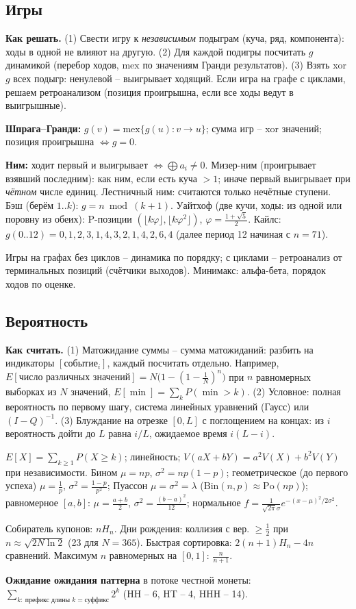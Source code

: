 \subsection{Игры}
\textbf{Как решать.} (1) Свести игру к \emph{независимым} подыграм (куча, ряд, компонента): ходы в одной не влияют на другую. (2) Для каждой подигры посчитать $g$ динамикой (перебор ходов, $\mathrm{mex}$ по значениям Гранди результатов). (3) Взять xor $g$ всех подыгр: ненулевой -- выигрывает ходящий. Если игра на графе с циклами, решаем ретроанализом (позиция проигрышна, если все ходы ведут в выигрышные).
\par \textbf{Шпрага--Гранди:} $g(v)=\mathrm{mex}\{g(u):v\to u\}$; сумма игр -- xor значений; позиция проигрышна $\iff g=0$.
\par \textbf{Ним:} ходит первый и выигрывает $\iff\bigoplus a_i\ne0$. Мизер-ним (проигрывает взявший последним): как ним, если есть куча $>1$; иначе первый выигрывает при \emph{чётном} числе единиц. Лестничный ним: считаются только нечётные ступени. Бэш (берём $1..k$): $g=n\bmod(k{+}1)$. Уайтхоф (две кучи, ходы: из одной или поровну из обеих): P-позиции $(\lfloor k\varphi\rfloor,\lfloor k\varphi^2\rfloor)$, $\varphi=\frac{1+\sqrt5}2$. Кайлс: $g(0..12)=0,1,2,3,1,4,3,2,1,4,2,6,4$ (далее период 12 начиная с $n=71$).
\par Игры на графах без циклов -- динамика по порядку; с циклами -- ретроанализ от терминальных позиций (счётчики выходов). Минимакс: альфа-бета, порядок ходов по оценке.
\subsection{Вероятность}
\textbf{Как считать.} (1) Матожидание суммы -- сумма матожиданий: разбить на индикаторы $[\text{событие}_i]$, каждый посчитать отдельно. Например, $E[\text{число различных значений}]=N\big(1-(1-\tfrac1N)^n\big)$ при $n$ равномерных выборках из $N$ значений, $E[\min]=\sum_kP(\min>k)$. (2) Условное: полная вероятность по первому шагу, система линейных уравнений (Гаусс) или $(I-Q)^{-1}$. (3) Блуждание на отрезке $[0,L]$ с поглощением на концах: из $i$ вероятность дойти до $L$ равна $i/L$, ожидаемое время $i(L-i)$.
\par $E[X]=\sum_{k\ge1}P(X\ge k)$; линейность; $V(aX{+}bY)=a^2V(X){+}b^2V(Y)$ при независимости.
Бином $\mu=np$, $\sigma^2=np(1{-}p)$; геометрическое (до первого успеха) $\mu=\frac1p$, $\sigma^2=\frac{1-p}{p^2}$; Пуассон $\mu=\sigma^2=\lambda$ ($\mathrm{Bin}(n,p)\approx\mathrm{Po}(np)$); равномерное $[a,b]$: $\mu=\frac{a+b}2$, $\sigma^2=\frac{(b-a)^2}{12}$; нормальное $f=\frac1{\sqrt{2\pi}\sigma}e^{-(x-\mu)^2/2\sigma^2}$.
\par Собиратель купонов: $nH_n$. Дни рождения: коллизия с вер. $\ge\frac12$ при $n\approx\sqrt{2N\ln2}$ (23 для $N{=}365$). Быстрая сортировка: $2(n{+}1)H_n-4n$ сравнений. Максимум $n$ равномерных на $[0,1]$: $\frac n{n+1}$.
\par \textbf{Ожидание ожидания паттерна} в потоке честной монеты: $\sum_{k:\ \text{префикс длины }k=\text{суффикс}}2^k$ (HH -- 6, HT -- 4, HHH -- 14).
